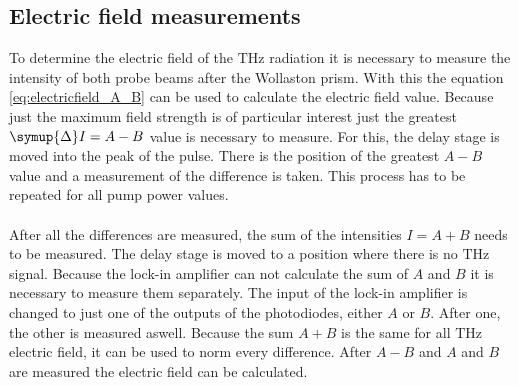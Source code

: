 \subsection{Electric field measurements}
\label{sec:field}
To determine the electric field of the $\si{\tera\hertz}$ radiation it is necessary to measure the intensity of both probe beams after the Wollaston prism.
With this the equation \eqref{eq:electricfield_A_B} can be used to calculate the electric field value.
Because just the maximum field strength is of particular interest just the greatest $\symup{\Delta}I = A-B$ value is necessary to measure.
For this, the delay stage is moved into the peak of the pulse.
There is the position of the greatest $A-B$ value and a measurement of the difference is taken.
This process has to be repeated for all pump power values.
\\\\
After all the differences are measured, the sum of the intensities $I = A + B$ needs to be measured.
The delay stage is moved to a position where there is no $\si{\tera\hertz}$ signal.
Because the lock-in amplifier can not calculate the sum of $A$ and $B$ it is necessary to measure them separately.
The input of the lock-in amplifier is changed to just one of the outputs of the photodiodes, either $A$ or $B$.
After one, the other is measured aswell.
Because the sum $A+B$ is the same for all $\si{\tera\hertz}$ electric field, it can be used to norm every difference.
After $A-B$ and $A$ and $B$ are measured the electric field can be calculated.
